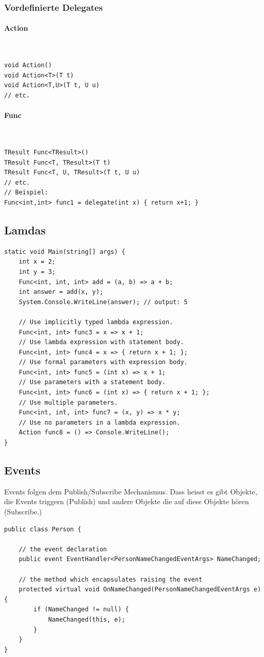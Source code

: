 \subsubsection{Vordefinierte Delegates}
\paragraph{Action} \hfill  \\
\begin{lstlisting}
void Action()
void Action<T>(T t)
void Action<T,U>(T t, U u)
// etc.
\end{lstlisting}

\paragraph{Func} \hfill \\
\begin{lstlisting}
TResult Func<TResult>()
TResult Func<T, TResult>(T t)
TResult Func<T, U, TResult>(T t, U u)
// etc.
// Beispiel:
Func<int,int> func1 = delegate(int x) { return x+1; }
\end{lstlisting}

\subsection{Lamdas}
\begin{lstlisting}[caption=C\# Lamdas]
static void Main(string[] args) {
	int x = 2;
	int y = 3;
	Func<int, int, int> add = (a, b) => a + b;
	int answer = add(x, y);
	System.Console.WriteLine(answer); // output: 5
	
	// Use implicitly typed lambda expression.
	Func<int, int> func3 = x => x + 1;
	// Use lambda expression with statement body.
	Func<int, int> func4 = x => { return x + 1; };
	// Use formal parameters with expression body.
	Func<int, int> func5 = (int x) => x + 1;
	// Use parameters with a statement body.
	Func<int, int> func6 = (int x) => { return x + 1; };
	// Use multiple parameters.
	Func<int, int, int> func7 = (x, y) => x * y;
	// Use no parameters in a lambda expression.
	Action func8 = () => Console.WriteLine();
}
\end{lstlisting}

\subsection{Events}
Events folgen dem Publish/Subscribe Mechanismus. Dass heisst es gibt Objekte, die Events triggern (Publish) und andere Objekte die auf diese Objekte hören (Subscribe.) 
\begin{lstlisting}[caption=C\# Events]
public class Person {

	// the event declaration
	public event EventHandler<PersonNameChangedEventArgs> NameChanged;

	// the method which encapsulates raising the event
	protected virtual void OnNameChanged(PersonNameChangedEventArgs e) {
		if (NameChanged != null) {
			NameChanged(this, e);
		}
	}
}
\end{lstlisting}

